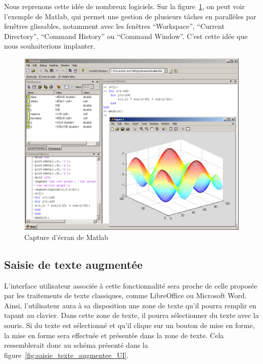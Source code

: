 \documentclass[a4paper,11pt,twoside]{article}
\begin{document}
Nous reprenons cette idée de nombreux logiciels. Sur la figure~\ref{fig:matlab}, on peut voir l'exemple de Matlab, qui permet une gestion de plusieurs tâches en parallèles par fenêtres glissables, notamment avec les fenêtres ``Workspace'', ``Current Directory'', ``Command History'' ou ``Command Window''. C'est cette idée que nous souhaiterions implanter.

\begin{figure}[!ht]
	\centerline{\includegraphics[scale=0.5]{matlab_mesh.jpg}}
    \caption{Capture d'écran de Matlab}
    \label{fig:matlab}
\end{figure}

\subsection{Saisie de texte augmentée}
L'interface utilisateur associée à cette fonctionnalité sera proche de celle proposée par les traitements de texte classiques, comme LibreOffice ou Microsoft Word. Ainsi, l'utilisateur aura à sa disposition une zone de texte qu'il pourra remplir en tapant au clavier. Dans cette zone de texte, il pourra sélectionner du texte avec la souris. Si du texte est sélectionné et qu'il clique sur un bouton de mise en forme, la mise en forme sera effectuée et présentée dans la zone de texte. Cela ressemblerait donc au schéma présenté dans la figure~\ref{fig:saisie_texte_augmentee_UI}.
\end{document}
